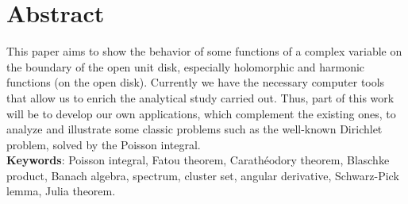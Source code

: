 %
%
%
%
%

\chapter{Abstract}

This paper aims to show the behavior of some functions of a complex variable on the boundary of the open unit disk, especially holomorphic and harmonic functions (on the open disk). Currently we have the necessary computer tools that allow us to enrich the analytical study carried out. Thus, part of this work will be to develop our own applications, which complement the existing ones, to analyze and illustrate some classic problems such as the well-known Dirichlet problem, solved by the Poisson integral. \\

\textbf{Keywords}: Poisson integral, Fatou theorem, Carathéodory theorem, Blaschke product, Banach algebra, spectrum, cluster set, angular derivative, Schwarz-Pick lemma, Julia theorem. \\


\endinput
